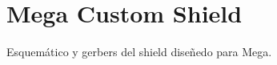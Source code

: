 
\chapter{Mega Custom Shield} %

\label{app:pcbFiles} %

Esquemático y gerbers del shield diseñedo para Mega.

\newpage



